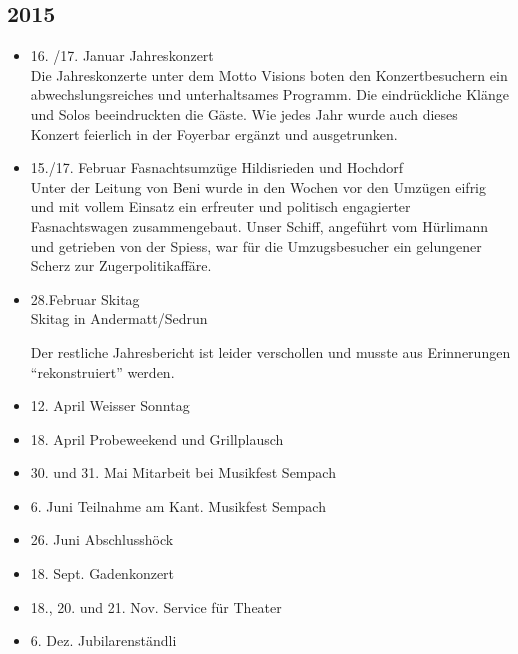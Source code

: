 \subsection*{2015}
\begin{history}


    \begin{itemize}

        \item 16. /17. Januar Jahreskonzert\\
              Die Jahreskonzerte unter dem Motto Visions boten den Konzertbesuchern
              ein abwechslungsreiches und unterhaltsames Programm. Die eindrückliche
              Klänge und Solos beeindruckten die Gäste. Wie jedes Jahr wurde auch
              dieses Konzert feierlich in der Foyerbar ergänzt und ausgetrunken.

        \item 15./17. Februar Fasnachtsumzüge Hildisrieden und Hochdorf\\
              Unter der Leitung von Beni wurde in den Wochen vor den Umzügen eifrig
              und mit vollem Einsatz ein erfreuter und politisch engagierter
              Fasnachtswagen zusammengebaut. Unser Schiff, angeführt vom Hürlimann und
              getrieben von der Spiess, war für die Umzugsbesucher ein gelungener
              Scherz zur Zugerpolitikaffäre.

        \item 28.Februar Skitag\\
              Skitag in Andermatt/Sedrun

              Der restliche Jahresbericht ist leider verschollen und musste aus Erinnerungen \enquote{rekonstruiert} werden.

        \item 12. April Weisser Sonntag
        \item 18. April Probeweekend und Grillplausch
        \item 30. und 31. Mai Mitarbeit bei Musikfest Sempach
        \item 6. Juni Teilnahme am Kant. Musikfest Sempach
        \item 26. Juni Abschlusshöck
        \item 18. Sept. Gadenkonzert
        \item 18., 20. und 21. Nov. Service für Theater
        \item 6. Dez. Jubilarenständli

    \end{itemize}

\end{history}
